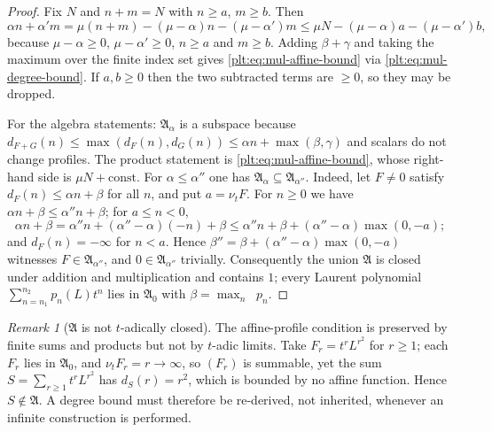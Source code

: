 \documentclass[11pt,oneside]{article}
\theoremstyle{plain}
\theoremstyle{definition}
\theoremstyle{remark}
\newtheorem{remark}[theorem]{Remark}
\newcommand{\ordt}{\nu_{t}}                              %
\DeclareMathOperator{\degL}{deg_{L}}
\newcommand{\dprofile}[1]{d_{#1}}                        %
\begin{document}
\begin{proof}
Fix $N$ and $n+m=N$ with $n\ge a$, $m\ge b$.  Then
\[
 \alpha n+\alpha'm
 =\mu(n+m)-(\mu-\alpha)n-(\mu-\alpha')m
 \le\mu N-(\mu-\alpha)a-(\mu-\alpha')b,
\]
because $\mu-\alpha\ge0$, $\mu-\alpha'\ge0$, $n\ge a$ and $m\ge b$.  Adding
$\beta+\gamma$ and taking the maximum over the finite index set gives
\eqref{plt:eq:mul-affine-bound} via \eqref{plt:eq:mul-degree-bound}.  If
$a,b\ge0$ then the two subtracted terms are $\ge0$, so they may be dropped.

For the algebra statements: $\mathfrak A_\alpha$ is a subspace because
$\dprofile{F+G}(n)\le\max(\dprofile{F}(n),\dprofile{G}(n))
\le\alpha n+\max(\beta,\gamma)$ and scalars do not change profiles.  The
product statement is \eqref{plt:eq:mul-affine-bound}, whose right-hand side is
$\mu N+\text{const}$.
For $\alpha\le\alpha''$ one has $\mathfrak A_\alpha\subseteq\mathfrak
A_{\alpha''}$.  Indeed, let $F\ne0$ satisfy $\dprofile{F}(n)\le\alpha n+\beta$
for all $n$, and put $a=\ordt F$.  For $n\ge0$ we have
$\alpha n+\beta\le\alpha''n+\beta$; for $a\le n<0$,
\[
 \alpha n+\beta=\alpha''n+(\alpha''-\alpha)(-n)+\beta
 \le\alpha''n+\beta+(\alpha''-\alpha)\max(0,-a);
\]
and $\dprofile{F}(n)=-\infty$ for $n<a$.  Hence
$\beta''=\beta+(\alpha''-\alpha)\max(0,-a)$ witnesses
$F\in\mathfrak A_{\alpha''}$, and $0\in\mathfrak A_{\alpha''}$ trivially.
Consequently the union $\mathfrak A$ is closed under
addition and multiplication and contains $1$; every Laurent polynomial
$\sum_{n=n_1}^{n_2}p_n(L)t^n$ lies in $\mathfrak A_0$ with
$\beta=\max_n\degL p_n$.
\end{proof}

\begin{remark}[$\mathfrak A$ is not $t$-adically closed]
\label{plt:rmk:mul-profile-not-closed}
The affine-profile condition is preserved by finite sums and products but not
by $t$-adic limits.  Take $F_r=t^rL^{r^2}$ for $r\ge1$; each $F_r$ lies in
$\mathfrak A_0$, and $\ordt F_r=r\to\infty$, so $(F_r)$ is summable, yet the
sum
$S=\sum_{r\ge1}t^rL^{r^2}$ has $\dprofile{S}(r)=r^2$, which is bounded by no
affine function.  Hence $S\notin\mathfrak A$.  A degree bound must therefore
be re-derived, not inherited, whenever an infinite construction is performed.
\end{remark}
\end{document}

